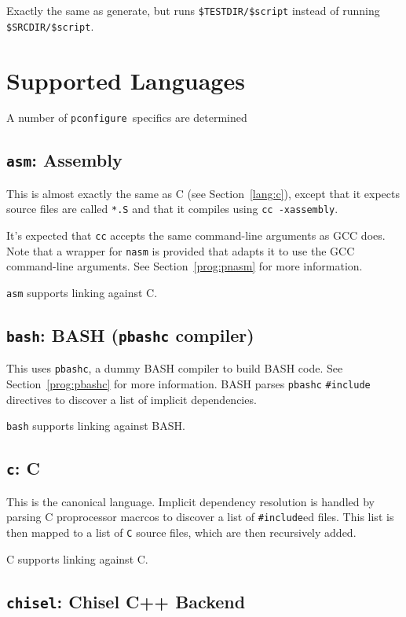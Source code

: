 \documentclass{article}
\newcommand{\pconfigure}{\texttt{pconfigure}}
\begin{document}
Exactly the same as generate, but runs \texttt{\$TESTDIR/\$script}
instead of running \texttt{\$SRCDIR/\$script}.

\section{Supported Languages \label{lang}}

A number of \pconfigure\ specifics are determined

\subsection{\texttt{asm}: Assembly}

This is almost exactly the same as C (see Section~\ref{lang:c}),
except that it expects source files are called \texttt{*.S} and that
it compiles using \texttt{cc -xassembly}.

It's expected that \texttt{cc} accepts the same command-line arguments
as GCC does.  Note that a wrapper for \texttt{nasm} is provided that
adapts it to use the GCC command-line arguments.  See
Section~\ref{prog:pnasm} for more information.

\texttt{asm} supports linking against C.

\subsection{\texttt{bash}: BASH (\texttt{pbashc} compiler) \label{lang:bash}}

This uses \texttt{pbashc}, a dummy BASH compiler to build BASH code.
See Section~\ref{prog:pbashc} for more information.  BASH parses
\texttt{pbashc} \texttt{\#include} directives to discover a list of
implicit dependencies.

\texttt{bash} supports linking against BASH.

\subsection{\texttt{c}: C \label{lang:c}}

This is the canonical language.  Implicit dependency resolution is
handled by parsing C proprocessor macrcos to discover a list of
\texttt{\#include}ed files.  This list is then mapped to a list of
\texttt{C} source files, which are then recursively added.

C supports linking against C.

\subsection{\texttt{chisel}: Chisel C++ Backend \label{chisel}}
\end{document}
